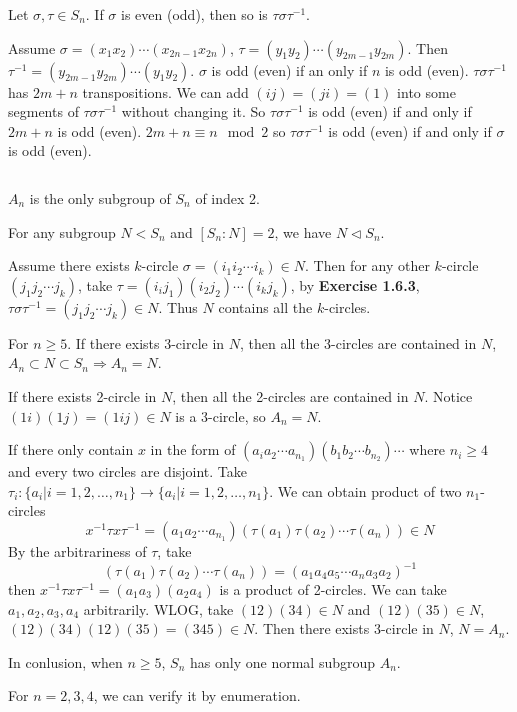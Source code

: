 $$ $$

\begin{ex}
    Let $\sigma, \tau \in S_{n}$. If $\sigma$ is even (odd), then so is $\tau\sigma\tau^{-1}$.
\end{ex}

\begin{answer}
    Assume $\sigma=(x_{1}x_{2})\cdots(x_{2n-1}x_{2n})$, $\tau=(y_{1}y_{2})\cdots(y_{2m-1}y_{2m})$. Then $\tau^{-1}=(y_{2m-1}y_{2m})\cdots(y_{1}y_{2})$. $\sigma$ is odd (even) if an only if $n$ is odd (even). $\tau\sigma\tau^{-1}$ has $2m+n$ transpositions. We can add $(ij)=(ji)=(1)$ into some segments of $\tau\sigma\tau^{-1}$ without changing it. So $\tau\sigma\tau^{-1}$ is odd (even) if and only if $2m+n$ is odd (even). $2m+n\equiv n\mod 2$ so $\tau\sigma\tau^{-1}$ is odd (even) if and only if $\sigma$ is odd (even).
\end{answer}

$$ $$

\begin{ex}
    $A_{n}$ is the only subgroup of $S_{n}$ of index 2.
\end{ex}

\begin{answer}
    For any subgroup $N<S_{n}$ and $\left[S_{n}:N\right]=2$, we have $N\lhd S_{n}$.

    Assume there exists $k$-circle $\sigma=(i_{1}i_{2}\cdots i_{k})\in N$. Then for any other $k$-circle $(j_{1}j_{2}\cdots j_{k})$, take $\tau=(i_{i}j_{1})(i_{2}j_{2})\cdots(i_{k}j_{k})$, by \textbf{Exercise 1.6.3}, $\tau\sigma\tau^{-1}=(j_{1}j_{2}\cdots j_{k})\in N$. Thus $N$ contains all the $k$-circles.

    For $n\geq 5$. If there exists 3-circle in $N$, then all the 3-circles are contained in $N$, $A_{n}\subset N\subset S_{n}\Rightarrow A_{n}=N$.

    If there exists 2-circle in $N$, then all the 2-circles are contained in $N$. Notice $(1i)(1j)=(1ij)\in N$ is a 3-circle, so $A_{n}=N$.

    If there only contain $x$ in the form of $(a_{i}a_{2}\cdots a_{n_{1}})(b_{1}b_{2}\cdots b_{n_{2}})\cdots$ where $n_{i}\geq 4$ and every two circles are disjoint. Take $\tau_{i}:\{a_{i}|i=1,2,\dots,n_{1}\}\to \{a_{i}|i=1,2,\dots,n_{1}\}$. We can obtain product of two $n_{1}$-circles\[x^{-1}\tau x \tau^{-1}=(a_{1}a_{2}\cdots a_{n_{1}})(\tau(a_{1})\tau(a_{2})\cdots \tau(a_{n}))\in N\] By the arbitrariness of $\tau$, take \[(\tau(a_{1})\tau(a_{2})\cdots \tau(a_{n}))=(a_{1}a_{4}a_{5}\cdots a_{n}a_{3}a_{2})^{-1}\] then $x^{-1}\tau x \tau^{-1}=(a_{1}a_{3})(a_{2}a_{4})$ is a product of 2-circles. We can take $a_{1}, a_{2}, a_{3}, a_{4}$ arbitrarily. WLOG, take $(12)(34)\in N$ and $(12)(35)\in N$, $(12)(34)(12)(35)=(345)\in N$. Then there exists 3-circle in $N$, $N=A_{n}$.

    In conlusion, when $n\geq 5$, $S_{n}$ has only one normal subgroup $A_{n}$.

    For $n=2,3,4$, we can verify it by enumeration.
\end{answer}

